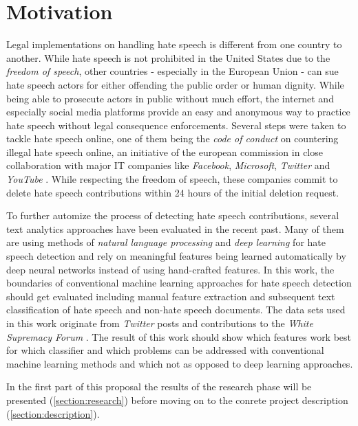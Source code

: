\section{Motivation}
Legal implementations on handling hate speech is different from one country to another. While hate speech is not prohibited in the United States due to the \textit{freedom of speech}, other countries - especially in the European Union - can sue hate speech actors for either offending the public order or human dignity. While being able to prosecute actors in public without much effort, the internet and especially social media platforms provide an easy and anonymous way to practice hate speech without legal consequence enforcements. Several steps were taken to tackle hate speech online, one of them being the \textit{code of conduct} on countering illegal hate speech online, an initiative of the european commission in close collaboration with major IT companies like \textit{Facebook}, \textit{Microsoft}, \textit{Twitter} and \textit{YouTube} \cite{EuropeanCommission.20200622}. While respecting the freedom of speech, these companies commit to delete hate speech contributions within 24 hours of the initial deletion request. 

To further automize the process of detecting hate speech contributions, several text analytics approaches have been evaluated in the recent past. Many of them are using methods of \textit{natural language processing} and \textit{deep learning} for hate speech detection and rely on meaningful features being learned automatically by deep neural networks instead of using hand-crafted features. In this work, the boundaries of conventional machine learning approaches for hate speech detection should get evaluated including manual feature extraction and subsequent text classification of hate speech and non-hate speech documents. The data sets used in this work originate from \textit{Twitter} posts \cite{ThomasDavidson.2020} and contributions to the \textit{White Supremacy Forum} \cite{OnadeGibert.2020}. The result of this work should show which features work best for which classifier and which problems can be addressed with conventional machine learning methods and which not as opposed to deep learning approaches.

In the first part of this proposal the results of the research phase will be presented (\autoref{section:research}) before moving on to the conrete project description (\autoref{section:description}). 
